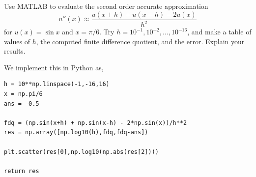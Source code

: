 \documentclass[10pt]{article}
\begin{document}
\maketitle

\begin{problem}[Problem 1]
Use MATLAB to evaluate the second order accurate approximation 
\[ u'' (x) \approx \frac{u(x+h) + u(x-h) - 2 u(x)}{h^2} \] 
    for \(u(x) = \sin x\) and \(x = \pi / 6\).  Try \(h = 10^{-1} , 10^{-2} , \ldots , 10^{-16}\), and make a table of values of \(h\), the computed finite difference quotient, and the error.  Explain your results.
\end{problem}

\begin{solution}[Solution]
We implement this in Python as,
\begin{lstlisting}
h = 10**np.linspace(-1,-16,16)
x = np.pi/6
ans = -0.5

fdq = (np.sin(x+h) + np.sin(x-h) - 2*np.sin(x))/h**2
res = np.array([np.log10(h),fdq,fdq-ans])

plt.scatter(res[0],np.log10(np.abs(res[2])))

return res
\end{lstlisting}


\end{solution}
\end{document}

